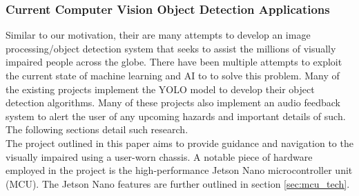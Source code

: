 \subsubsection{Current Computer Vision Object Detection Applications}

\noindent Similar to our motivation, their are many attempts to develop an image processing/object detection system that seeks to assist the millions of visually impaired people across the globe. There have been multiple attempts to exploit the current state of machine learning and AI to to solve this problem. Many of the existing projects implement the YOLO model to develop their object detection algorithms. Many of these projects also implement an audio feedback system to alert the user of any upcoming hazards and important details of such. The following sections detail such research. \\                                                                                                                                                                                                                                                                                                                                                                                                                                                                                                                                                                                                                                                                                                                                                                                                                                                                                                                                                                                                                                                                                                                                                                                                                                                 

\noindent The project outlined in this paper \cite{CVRef1} aims to provide guidance and navigation to the visually impaired using a user-worn chassis. A notable piece of hardware employed in the project is the high-performance Jetson Nano microcontroller unit (MCU). The Jetson Nano features are further outlined in section \ref{sec:mcu_tech}. \\

